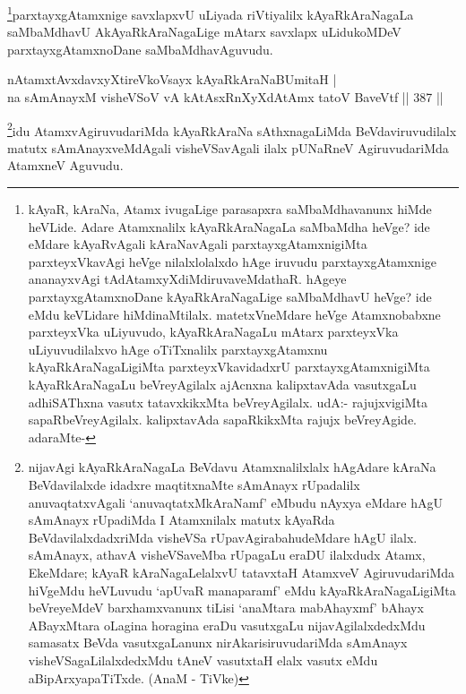 \begin{artha}
\footnote{kAyaR, kAraNa, Atamx ivugaLige parasapxra saMbaMdhavanunx hiMde heVLide. Adare Atamxnalilx kAyaRkAraNagaLa saMbaMdha heVge? ide eMdare kAyaRvAgali kAraNavAgali parxtayxgAtamxnigiMta parxteyxVkavAgi heVge nilalxlolalxdo hAge iruvudu parxtayxgAtamxnige ananayxvAgi tAdAtamxyXdiMdiruvaveMdathaR. hAgeye parxtayxgAtamxnoDane kAyaRkAraNagaLige saMbaMdhavU heVge? ide eMdu keVLidare hiMdinaMtilalx. matetxVneMdare heVge Atamxnobabxne parxteyxVka uLiyuvudo, kAyaRkAraNagaLu mAtarx parxteyxVka uLiyuvudilalxvo hAge oTiTxnalilx parxtayxgAtamxnu kAyaRkAraNagaLigiMta parxteyxVkavidadxrU parxtayxgAtamxnigiMta kAyaRkAraNagaLu beVreyAgilalx ajAcnxna kalipxtavAda vasutxgaLu adhiSAThxna vasutx tatavxkikxMta beVreyAgilalx. udA:- rajujxvigiMta sapaRbeVreyAgilalx. kalipxtavAda sapaRkikxMta rajujx beVreyAgide. adaraMte-}parxtayxgAtamxnige savxlapxvU uLiyada riVtiyalilx kAyaRkAraNagaLa saMbaMdhavU AkAyaRkAraNagaLige mAtarx savxlapx uLidukoMDeV parxtayxgAtamxnoDane saMbaMdhavAguvudu.
\end{artha}


\begin{shl}
nA\s \s tamxtAvxdavxyXtireVkoV\s sayx kAyaRkAraNaBUmitaH | \\
na sAmAnayxM visheVSoV vA kAtAsxRnXyXdAtAmx tatoV BaveVtf \hfill||  387 ||  
\end{shl}

\begin{artha}
\footnote{nijavAgi kAyaRkAraNagaLa BeVdavu Atamxnalilxlalx hAgAdare kAraNa BeVdavilalxde idadxre maqtitxnaMte sAmAnayx rUpadalilx anuvaqtatxvAgali `anuvaqtatxMkAraNamf' eMbudu nAyxya eMdare hAgU sAmAnayx rUpadiMda I Atamxnilalx matutx kAyaRda BeVdavilalxdadxriMda visheVSa rUpavAgirabahudeMdare hAgU ilalx. sAmAnayx, athavA visheVSaveMba rUpagaLu eraDU ilalxdudx Atamx, EkeMdare; kAyaR kAraNagaLelalxvU tatavxtaH AtamxveV AgiruvudariMda hiVgeMdu heVLuvudu `apUvaR manaparamf' eMdu kAyaRkAraNagaLigiMta beVreyeMdeV barxhamxvanunx tiLisi `anaMtara mabAhayxmf' bAhayx ABayxMtara oLagina horagina eraDu vasutxgaLu nijavAgilalxdedxMdu samasatx BeVda vasutxgaLanunx nirAkarisiruvudariMda sAmAnayx visheVSagaLilalxdedxMdu tAneV vasutxtaH elalx vasutx eMdu aBipArxyapaTiTxde. (AnaM - TiVke)}idu AtamxvAgiruvudariMda kAyaRkAraNa sAthxnagaLiMda BeVdaviruvudilalx matutx sAmAnayxveMdAgali visheVSavAgali ilalx pUNaRneV AgiruvudariMda AtamxneV Aguvudu.
\end{artha}

